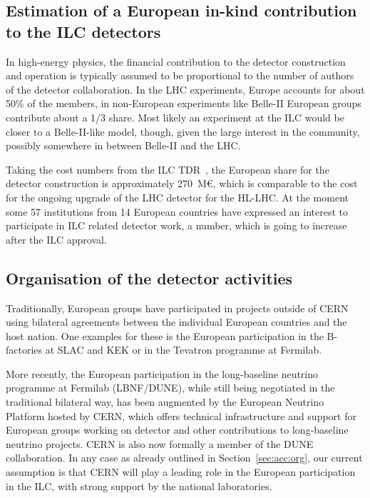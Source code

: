 \documentclass[%
 reprint,
 floatfix,
 amsmath,amssymb,
 aps,
]{revtex4-1}
\begin{document}
\subsection{\label{sec:det:constructionmodel} Estimation of a
European in-kind contribution to the ILC detectors}

In high-energy physics, the financial contribution to the detector
construction and operation is typically assumed to be proportional to the number of authors of
the detector collaboration. In the LHC experiments, Europe accounts for about 50\% of the members, 
in non-European experiments like Belle-II European groups contribute about a 1/3 share. Most likely 
an experiment at the ILC would be closer to a Belle-II-like model, though, given the large interest 
in the community, possibly somewhere in between Belle-II and the LHC. 

Taking the cost numbers from the ILC TDR~\cite{Behnke:2013lya}, the European share for the detector construction 
is approximately 270~M\euro{}, which is comparable to the cost for the ongoing upgrade of the LHC detector for the HL-LHC. 
At the moment some 57 institutions from 14 European countries have expressed 
an interest to participate in ILC related detector work, a number, which is going to increase after the ILC approval.

\subsection{\label{sec:det:Organisation} Organisation of the detector activities}
Traditionally, European groups have participated in projects outside of CERN using bilateral agreements between the individual 
European countries and the host nation. One examples for these is the European 
participation in the B-factories at SLAC and KEK or in the Tevatron programme at 
Fermilab.

More recently, the European participation in the long-baseline neutrino 
programme at Fermilab (LBNF/DUNE), while still being negotiated in the 
traditional bilateral way, has been augmented by the European Neutrino Platform 
hosted by CERN, which offers technical infrastructure and support for European 
groups working on detector and other contributions to long-baseline neutrino 
projects. CERN is also now formally a member of the DUNE collaboration.
In any case as already outlined in Section~\ref{sec:acc:org}, our current assumption is that 
CERN will play a leading role in the European participation in the ILC, with strong support by the national laboratories.
\end{document}

